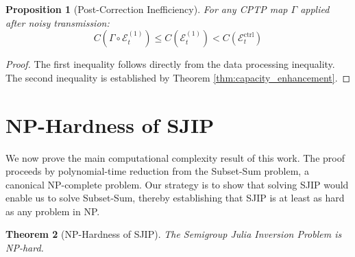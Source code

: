 \documentclass[12pt,a4paper]{article}
\newtheorem{theorem}{Theorem}[section]
\newtheorem{proposition}[theorem]{Proposition}
\begin{document}
\begin{proposition}[Post-Correction Inefficiency]
For any CPTP map $\Gamma$ applied after noisy transmission:
\begin{equation}
C(\Gamma \circ \mathcal{E}_t^{(1)}) \leq C(\mathcal{E}_t^{(1)}) < C(\mathcal{E}_t^{\text{ctrl}})
\end{equation}
\end{proposition}

\begin{proof}
The first inequality follows directly from the data processing inequality. The second inequality is established by Theorem \ref{thm:capacity_enhancement}.
\end{proof}

\section{NP-Hardness of SJIP}

We now prove the main computational complexity result of this work. The proof proceeds by polynomial-time reduction from the Subset-Sum problem, a canonical NP-complete problem. Our strategy is to show that solving SJIP would enable us to solve Subset-Sum, thereby establishing that SJIP is at least as hard as any problem in NP.

\begin{theorem}[NP-Hardness of SJIP]
\label{thm:sjip_nphard}
The Semigroup Julia Inversion Problem is NP-hard.
\end{theorem}
\end{document}
